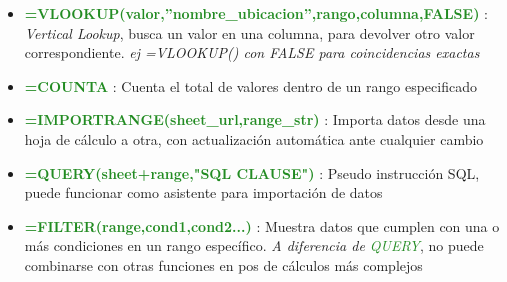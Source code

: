 \begin{itemize}
    \item {\textcolor{ForestGreen}{\textbf{=VLOOKUP(valor,''nombre\_ubicacion'',rango,columna,FALSE)}} : \textit{Vertical Lookup}, busca un valor en una columna, para devolver otro valor correspondiente. \textit{ej =VLOOKUP() con FALSE para coincidencias exactas}}
    \item {\textcolor{ForestGreen}{\textbf{=COUNTA}} : Cuenta el total de valores dentro de un rango especificado}
    \item {\textcolor{ForestGreen}{\textbf{=IMPORTRANGE(sheet\_url,range\_str)}} : Importa datos desde una hoja de cálculo a otra, con actualización automática ante cualquier cambio}
    \item {\textcolor{ForestGreen}{\textbf{=QUERY(sheet+range,"SQL CLAUSE")}} : Pseudo instrucción SQL, puede funcionar como asistente para importación de datos}
    \item {\textcolor{ForestGreen}{\textbf{=FILTER(range,cond1,cond2...)}} : Muestra datos que cumplen con una o más condiciones en un rango específico. \textit{A diferencia de \textcolor{ForestGreen}{QUERY}}, no puede combinarse con otras funciones en pos de cálculos más complejos}
    
\end{itemize}

